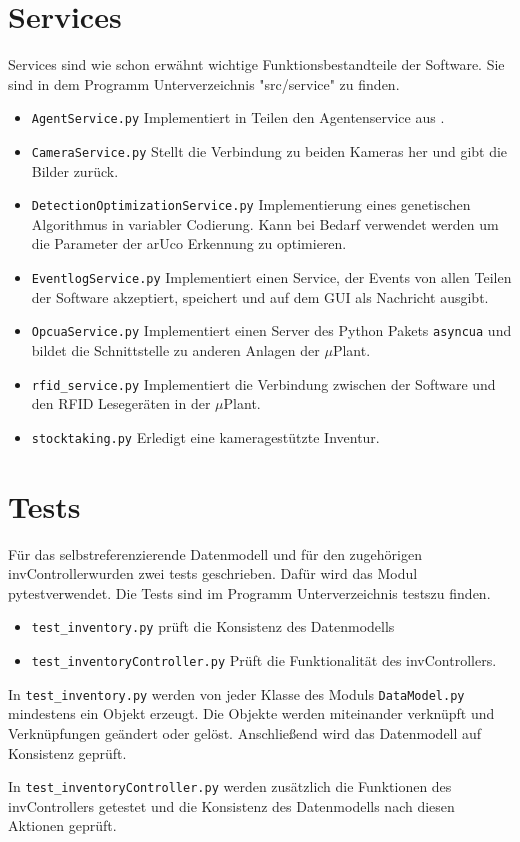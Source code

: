\section{Services}
Services sind wie schon erwähnt wichtige Funktionsbestandteile der Software. Sie sind in dem Programm Unterverzeichnis "src/service" zu finden.
\begin{itemize}
    \item \verb|AgentService.py| Implementiert in Teilen den Agentenservice aus \cite{LarsKistner2017}.
    \item \verb|CameraService.py| Stellt die Verbindung zu beiden Kameras her und gibt die Bilder zurück.
    \item \verb|DetectionOptimizationService.py| Implementierung eines genetischen Algorithmus in variabler Codierung. Kann bei Bedarf verwendet werden um die 
    Parameter der arUco Erkennung zu optimieren. 
    \item \verb|EventlogService.py| Implementiert einen Service, der Events von allen Teilen der Software akzeptiert, speichert und auf dem GUI als Nachricht ausgibt. 
    \item \verb|OpcuaService.py| Implementiert einen Server des Python Pakets \verb|asyncua| \cite{asyncua} und bildet die Schnittstelle zu anderen Anlagen der $\mu$Plant. 
    \item \verb|rfid_service.py| Implementiert die Verbindung zwischen der Software und den RFID Lesegeräten in der $\mu$Plant. 
    \item \verb|stocktaking.py| Erledigt eine kameragestützte Inventur. 
\end{itemize}

\section{Tests}
Für das selbstreferenzierende Datenmodell und für den zugehörigen \glqq invController\grqq wurden zwei tests geschrieben. 
Dafür wird das Modul \glqq pytest\grqq verwendet. Die Tests sind im Programm Unterverzeichnis \glqq tests\grqq zu finden. 
\begin{itemize}
    \item \verb|test_inventory.py| prüft die Konsistenz des Datenmodells
    \item \verb|test_inventoryController.py| Prüft die Funktionalität des invControllers.
\end{itemize} 
In \verb|test_inventory.py| werden von jeder Klasse des Moduls \verb|DataModel.py| mindestens ein Objekt erzeugt. 
Die Objekte werden miteinander verknüpft und Verknüpfungen geändert oder gelöst. Anschließend wird das Datenmodell auf Konsistenz geprüft. 

In \verb|test_inventoryController.py| werden zusätzlich die Funktionen des invControllers getestet und die Konsistenz des
Datenmodells nach diesen Aktionen geprüft. 

